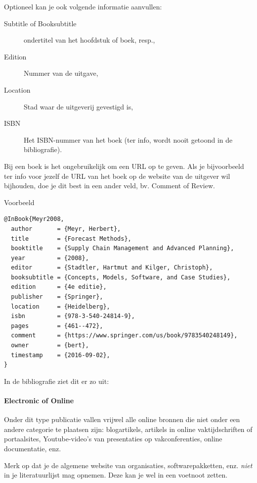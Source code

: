 Optioneel kan je ook volgende informatie aanvullen:

\begin{description}
  \item[Subtitle of Booksubtitle] ondertitel van het hoofdstuk of boek, resp.,
  \item[Edition] Nummer van de uitgave,
  \item[Location] Stad waar de uitgeverij gevestigd is,
  \item[ISBN] Het ISBN-nummer van het boek (ter info, wordt nooit getoond in de bibliografie).
\end{description}

Bij een boek is het ongebruikelijk om een URL op te geven. Als je bijvoorbeeld ter info voor jezelf de URL van het boek op de website van de uitgever wil bijhouden, doe je dit best in een ander veld, bv. Comment of Review.

Voorbeeld
\begin{verbatim}
@InBook{Meyr2008,
  author       = {Meyr, Herbert},
  title        = {Forecast Methods},
  booktitle    = {Supply Chain Management and Advanced Planning},
  year         = {2008},
  editor       = {Stadtler, Hartmut and Kilger, Christoph},
  booksubtitle = {Concepts, Models, Software, and Case Studies},
  edition      = {4e editie},
  publisher    = {Springer},
  location     = {Heidelberg},
  isbn         = {978-3-540-24814-9},
  pages        = {461--472},
  comment      = {https://www.springer.com/us/book/9783540248149},
  owner        = {bert},
  timestamp    = {2016-09-02},
}
\end{verbatim}


In de bibliografie ziet dit er zo uit:


\paragraph{Electronic of Online}

Onder dit type publicatie vallen vrijwel alle online bronnen die niet onder een andere categorie te plaatsen zijn: blogartikels, artikels in online vaktijdschriften of portaalsites, Youtube-video's van presentaties op vakconferenties, online documentatie, enz.

Merk op dat je de algemene website van organisaties, softwarepakketten, enz. \emph{niet} in je literatuurlijst mag opnemen. Deze kan je wel in een voetnoot zetten.

